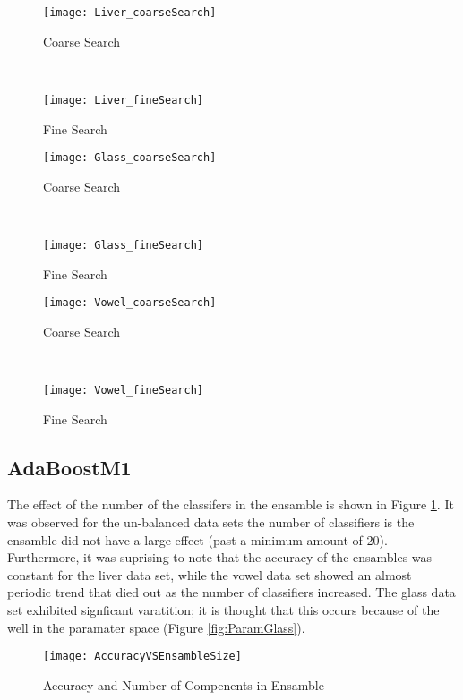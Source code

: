 \begin{figure*}[!ht]
	\centering
	\begin{subfigure}[b]{0.41\textwidth}
		\centering
		\texttt{[image: Liver\_coarseSearch]}
        \caption{Coarse Search}
	\end{subfigure}%
	~
	\begin{subfigure}[b]{0.41\textwidth}
		\centering
		\texttt{[image: Liver\_fineSearch]}
        \caption{Fine Search}
	\end{subfigure}	
	\caption{Parameter search for Liver Disorder}
	\label{fig:ParamLiver}

	\begin{subfigure}[b]{0.41\textwidth}
		\centering
		\texttt{[image: Glass\_coarseSearch]}
        \caption{Coarse Search}
	\end{subfigure}%
	~
	\begin{subfigure}[b]{0.41\textwidth}
		\centering
		\texttt{[image: Glass\_fineSearch]}
        \caption{Fine Search}
	\end{subfigure}	
	\caption{Parameter search for Glass Disorder}
	\label{fig:ParamGlass}

	\begin{subfigure}[b]{0.41\textwidth}
		\centering
		\texttt{[image: Vowel\_coarseSearch]}
        \caption{Coarse Search}
	\end{subfigure}%
	~
	\begin{subfigure}[b]{0.41\textwidth}
		\centering
		\texttt{[image: Vowel\_fineSearch]}
        \caption{Fine Search}
	\end{subfigure}	
	\caption{Parameter search for Vowel Disorder}
	\label{fig:ParamVowel}
\end{figure*}

\subsection{AdaBoostM1}
\label{sec:Results_AdaBoost}
The effect of the number of the classifers in the ensamble is shown in Figure \ref{fig:AccuracyEnsambleSize}.
It was observed for the un-balanced data sets the number of classifiers is the ensamble did not have a large effect (past a minimum amount of 20).
Furthermore, it was suprising to note that the accuracy of the ensambles was constant for the liver data set, while the vowel data set showed an almost periodic trend that died out as the number of classifiers increased.
The glass data set exhibited signficant varatition; it is thought that this occurs because of the well in the paramater space (Figure \ref{fig:ParamGlass}).
\begin{figure}[!ht]
    \centering
    \texttt{[image: AccuracyVSEnsambleSize]}
    \caption{Accuracy and Number of Compenents in Ensamble}
    \label{fig:AccuracyEnsambleSize}
\end{figure}


